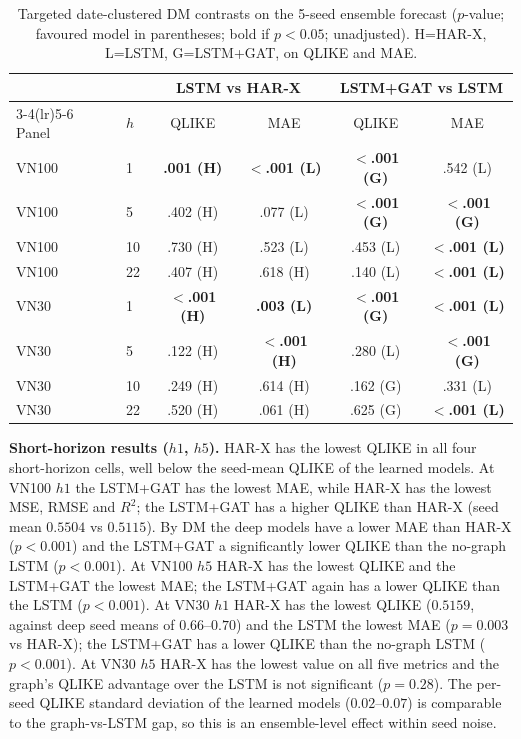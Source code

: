 \documentclass[runningheads]{llncs}
\begin{document}
\begin{table}[t]
\centering
\caption{Targeted date-clustered DM contrasts on the 5-seed ensemble forecast ($p$-value; favoured model in parentheses; bold if $p<0.05$; unadjusted).
H=HAR-X, L=LSTM, G=LSTM+GAT, on QLIKE and MAE.}
\label{tab:dm}
\footnotesize
\setlength{\tabcolsep}{5pt}
\begin{tabular}{ll cc cc}
\toprule
& & \multicolumn{2}{c}{LSTM vs HAR-X} & \multicolumn{2}{c}{LSTM+GAT vs LSTM} \\
\cmidrule(lr){3-4}\cmidrule(lr){5-6}
Panel & $h$ & QLIKE & MAE & QLIKE & MAE \\
\midrule
VN100 & 1  & \textbf{.001 (H)} & \textbf{$<$.001 (L)} & \textbf{$<$.001 (G)} & .542 (L) \\
VN100 & 5  & .402 (H) & .077 (L) & \textbf{$<$.001 (G)} & \textbf{$<$.001 (G)} \\
VN100 & 10 & .730 (H) & .523 (L) & .453 (L) & \textbf{$<$.001 (L)} \\
VN100 & 22 & .407 (H) & .618 (H) & .140 (L) & \textbf{$<$.001 (L)} \\
\midrule
VN30 & 1  & \textbf{$<$.001 (H)} & \textbf{.003 (L)} & \textbf{$<$.001 (G)} & \textbf{$<$.001 (L)} \\
VN30 & 5  & .122 (H) & \textbf{$<$.001 (H)} & .280 (L) & \textbf{$<$.001 (G)} \\
VN30 & 10 & .249 (H) & .614 (H) & .162 (G) & .331 (L) \\
VN30 & 22 & .520 (H) & .061 (H) & .625 (G) & \textbf{$<$.001 (L)} \\
\bottomrule
\end{tabular}
\end{table}

\textbf{Short-horizon results ($h1$, $h5$).} HAR-X has the lowest QLIKE in all four short-horizon cells, well
below the seed-mean QLIKE of the learned models. At VN100 $h1$ the LSTM+GAT has the lowest MAE, while HAR-X has the lowest MSE, RMSE and $R^2$; the
LSTM+GAT has a higher QLIKE than HAR-X (seed mean $0.5504$ vs $0.5115$). By DM the deep models have a lower
MAE than HAR-X ($p<0.001$) and the LSTM+GAT a significantly lower QLIKE than the no-graph LSTM ($p<0.001$). At
VN100 $h5$ HAR-X has the lowest QLIKE and the LSTM+GAT the lowest MAE; the LSTM+GAT again has a lower QLIKE than
the LSTM ($p<0.001$). At VN30 $h1$ HAR-X has the lowest QLIKE ($0.5159$, against deep seed means of
$0.66$--$0.70$) and the LSTM the lowest MAE ($p=0.003$ vs HAR-X); the LSTM+GAT has a lower QLIKE than the
no-graph LSTM ($p<0.001$). At VN30 $h5$ HAR-X has the lowest value on all five metrics and the graph's QLIKE
advantage over the LSTM is not significant ($p=0.28$). The per-seed QLIKE standard deviation of the learned
models ($0.02$--$0.07$) is comparable to the graph-vs-LSTM gap, so this is an ensemble-level effect within seed
noise.
\end{document}
